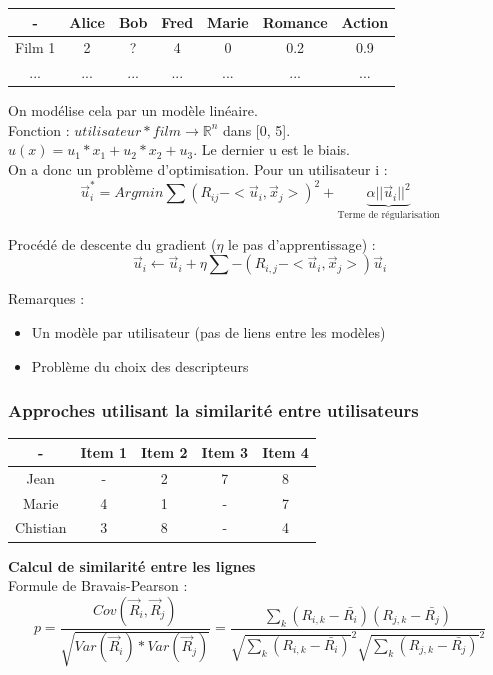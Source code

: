 \documentclass{article}
\begin{document}
\begin{center}
\begin{tabular}{c|c|c|c|c|c|c}
- & Alice & Bob & Fred & Marie & Romance & Action \\
\hline
Film 1 & 2 & ? & 4 & 0 & 0.2 & 0.9 \\
... & ... & ... & ... & ... & ... & ...
\end{tabular}
\end{center}

On modélise cela par un modèle linéaire. \\
Fonction : $utilisateur * film \rightarrow \mathbb{R}^n$ dans [0, 5]. \\
$u(x) = u_1 * x_1 + u_2 * x_2 + u_3$. Le dernier u est le biais. \\
On a donc un problème d'optimisation. Pour un utilisateur i :
$$ \vec{u}_i^* = Argmin { \sum (R_{ij} - < \vec{u}_i, \vec{x}_j >)^2 + \underbrace{\alpha || \vec{u}_i ||^2}_{\text{Terme de régularisation}} } $$

Procédé de descente du gradient ($\eta$ le pas d'apprentissage) :
$$ \vec{u}_i \leftarrow \vec{u}_i + \eta { \sum - (R_{i, j} - < \vec{u}_i, \vec{x}_j >) \vec{u}_i } $$

Remarques :
\begin{itemize}
\item Un modèle par utilisateur (pas de liens entre les modèles)
\item Problème du choix des descripteurs
\end{itemize}

\subsubsection{Approches utilisant la similarité entre utilisateurs}

\begin{center}
\begin{tabular}{c|c|c|c|c}

- & Item 1 & Item 2 & Item 3 & Item 4 \\
\hline
Jean & - & 2 & 7 & 8 \\
Marie & 4 & 1 & - & 7 \\
Chistian & 3 & 8 & - & 4

\end{tabular}
\end{center}

\textbf{Calcul de similarité entre les lignes} \\
Formule de Bravais-Pearson : 
$$ p = \frac{Cov(\vec{R}_i, \vec{R}_j)}{\sqrt{Var(\vec{R}_i) * Var(\vec{R}_j)}} = \frac{\sum_k (R_{i,k} - \bar{R_i})(R_{j,k} - \bar{R_j})}{\sqrt{\sum_k (R_{i,k} - \bar{R_i})}^2 \sqrt{\sum_k (R_{j,k} - \bar{R_j})}^2} $$
\end{document}
